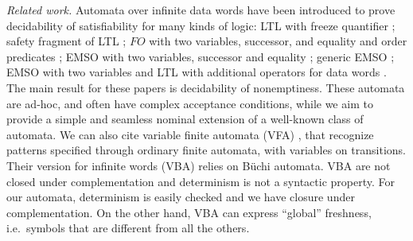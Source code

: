 \emph{Related work.} Automata over infinite data words have been introduced to prove decidability of satisfiability for many kinds of logic: LTL with freeze quantifier \cite{DemriL09}; safety fragment of LTL \cite{Lazic11}; $FO$ with two variables, successor, and equality and order predicates \cite{BojanczykDMSS11}; EMSO with two variables, successor and equality \cite{KaraST12}; generic EMSO \cite{Bollig11}; EMSO with two variables and LTL with additional operators for data words \cite{KaraT10}. The main result for these papers is decidability of nonemptiness. These automata are ad-hoc, and often have complex acceptance conditions, while we aim to provide a simple and seamless nominal extension of a well-known class of automata. We can also cite variable finite automata (VFA) \cite{GrumbergKS10}, that recognize patterns specified through ordinary finite automata, with variables on transitions. Their version for infinite words (VBA) relies on B\"uchi automata. VBA are not closed under complementation and determinism is not a syntactic property.
For our automata, determinism is easily checked and we have closure under complementation. On the other hand, VBA can express ``global'' freshness, i.e.\ symbols that are different from all the others. 
% 
